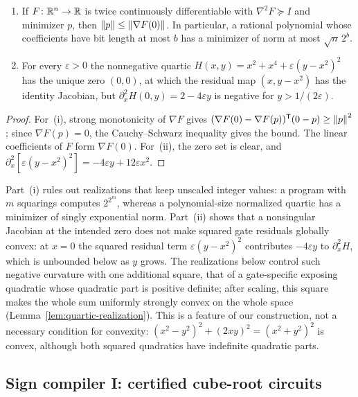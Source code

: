 \begin{proposition}
\label{prop:reductions-obstacles}
\leavevmode
\begin{enumerate}[label=(\roman*)]
\item If $F\colon\mathbb R^n\to\mathbb R$ is twice continuously differentiable with
$\nabla^2F\succeq I$ and minimizer $p$, then $\left\lVert p\right\rVert\le\left\lVert\nabla F(0)\right\rVert$.
In particular, a rational polynomial whose coefficients have bit length at
most $b$ has a minimizer of norm at most $\sqrt n\,2^b$.
\item For every $\varepsilon>0$ the nonnegative quartic
$H(x,y)=x^2+x^4+\varepsilon(y-x^2)^2$ has the unique zero $(0,0)$, at which
the residual map $(x,y-x^2)$ has the identity Jacobian, but
$\partial_x^2H(0,y)=2-4\varepsilon y$ is negative for $y>1/(2\varepsilon)$.
\end{enumerate}
\end{proposition}

\begin{proof}
For~(i), strong monotonicity of $\nabla F$ gives
$(\nabla F(0)-\nabla F(p))^{\mathsf T}(0-p)\ge\left\lVert p\right\rVert^2$; since
$\nabla F(p)=0$, the Cauchy--Schwarz inequality gives the bound. The linear
coefficients of $F$ form $\nabla F(0)$. For~(ii), the zero set is clear, and
$\partial_x^2[\varepsilon(y-x^2)^2]=-4\varepsilon y+12\varepsilon x^2$.
\end{proof}

Part~(i) rules out realizations that keep unscaled integer values: a
program with $m$ squarings computes $2^{2^m}$, whereas a polynomial-size
normalized quartic has a minimizer of singly exponential norm. Part~(ii) shows
that a nonsingular Jacobian at the intended zero does not make squared gate
residuals globally convex: at $x=0$ the squared residual term
$\varepsilon(y-x^2)^2$ contributes $-4\varepsilon y$ to $\partial_x^2H$, which
is unbounded below as $y$ grows. The realizations below control such negative
curvature with one additional square, that of a gate-specific exposing
quadratic whose quadratic part is positive definite; after scaling, this
square makes the whole sum uniformly strongly convex on the whole space
(Lemma~\ref{lem:quartic-realization}).
This is a feature of our construction, not a necessary condition for
convexity: $(x^2-y^2)^2+(2xy)^2=(x^2+y^2)^2$ is convex, although both squared
quadratics have indefinite quadratic parts.

\subsection{Sign compiler I: certified cube-root circuits}
\label{sec:reductions-root-compiler}

